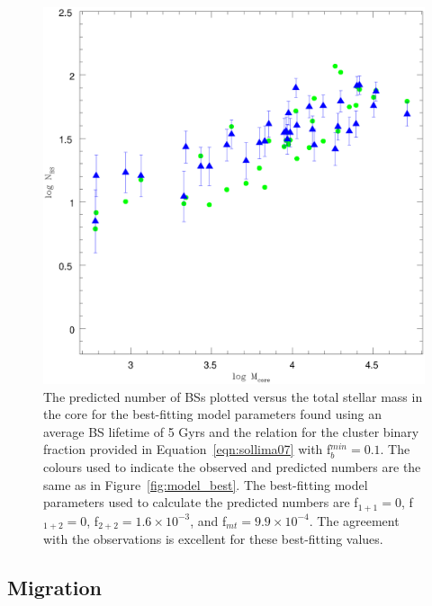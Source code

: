 \begin{figure} [!h]
  \begin{center}
 \includegraphics[scale=0.5]{Chapter-5/fig4.eps}
\caption[The predicted number of BSs plotted versus the total stellar
mass in the core for the best-fitting model parameters found using an
average BS lifetime of 5 Gyrs and the relation for the cluster binary
fraction provided in Equation~\ref{eqn:sollima07} with f$_b^{min} =
0.1$]{The predicted 
  number of BSs plotted versus the total stellar mass in the core for
  the best-fitting model parameters found using an average BS lifetime
  of 5 Gyrs and the relation for the cluster binary fraction provided
  in Equation~\ref{eqn:sollima07} with f$_b^{min} = 0.1$.  The
  colours used to indicate the observed and predicted numbers are the
  same as in Figure~\ref{fig:model_best}.  The best-fitting model parameters
  used to calculate the predicted numbers are f$_{1+1} = 0$, f$_{1+2}
  = 0$, f$_{2+2} = 1.6 \times 10^{-3}$, and f$_{mt} = 9.9 \times
  10^{-4}$.  The agreement with the observations is excellent for these
  best-fitting values.
\label{fig:model_best_rmax_sollima_10min_tBS50}}
\end{center}
\end{figure}

\subsection{Migration} \label{results-migration}

